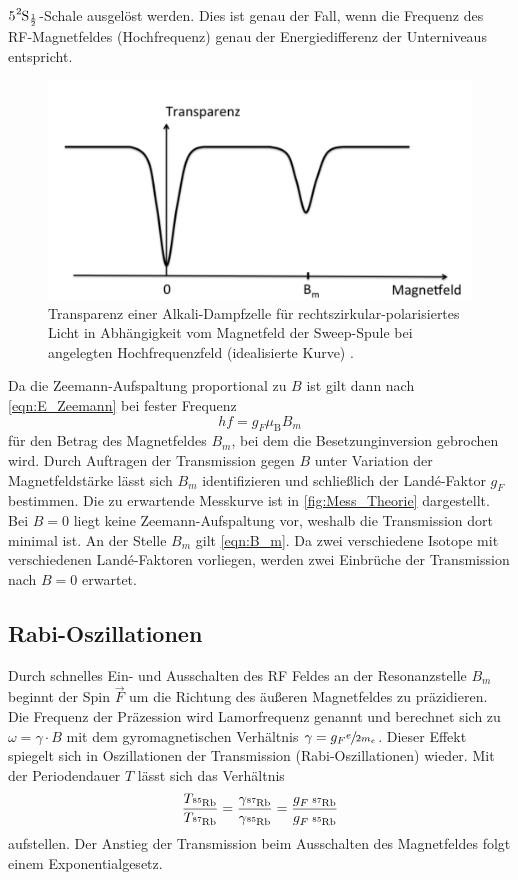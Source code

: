 $5\ce{^{2}\text{S}_{\frac{1}{2}}}$-Schale ausgelöst werden. Dies ist genau der Fall, wenn die Frequenz des RF-Magnetfeldes (Hochfrequenz) genau der 
Energiedifferenz der Unterniveaus entspricht. 
\begin{figure}
    \centering
    \includegraphics[width = .75\textwidth]{"content/pics/Messkurve_Theorie.png"}
    \caption{Transparenz einer Alkali-Dampfzelle für rechtszirkular-polarisiertes Licht in
    Abhängigkeit vom Magnetfeld der Sweep-Spule bei angelegten Hochfrequenzfeld
    (idealisierte Kurve) \cite{v21old}.}
    \label{fig:Mess_Theorie}
\end{figure}
Da die Zeemann-Aufspaltung proportional zu $B$ ist gilt dann nach \autoref{eqn:E_Zeemann} bei fester Frequenz
\begin{equation}
    \label{eqn:B_m}
    hf = g_F \mu_\text{B} B_m
\end{equation}
für den Betrag des Magnetfeldes $B_m$, bei dem die Besetzunginversion gebrochen wird.
Durch Auftragen der Transmission gegen $B$ unter Variation der Magnetfeldstärke lässt sich $B_m$ identifizieren und schließlich der Landé-Faktor $g_F$ bestimmen.
Die zu erwartende Messkurve ist in \autoref{fig:Mess_Theorie} dargestellt. Bei $B=0$ liegt keine Zeemann-Aufspaltung vor, weshalb die Transmission dort minimal ist.
An der Stelle $B_m$ gilt \autoref{eqn:B_m}. Da zwei verschiedene Isotope mit verschiedenen Landé-Faktoren vorliegen, werden zwei Einbrüche der Transmission nach 
$B = 0$ erwartet.

\subsection{Rabi-Oszillationen}
Durch schnelles Ein- und Ausschalten des RF Feldes an der Resonanzstelle $B_m$ beginnt der Spin $\vec{F}$ um die Richtung des äußeren Magnetfeldes zu 
präzidieren. Die Frequenz der Präzession wird Lamorfrequenz genannt und berechnet sich zu $\omega = \gamma \cdot B$ mit dem gyromagnetischen Verhältnis 
$\gamma = g_F \sfrac{e}{2m_e}$. Dieser Effekt spiegelt sich in Oszillationen der Transmission (Rabi-Oszillationen) wieder. Mit der Periodendauer $T$ lässt sich 
das Verhältnis
\begin{equation}
    \frac{T_{\ce{^{85}Rb}}}{T_{\ce{^{87}Rb}}} = \frac{\gamma_{\ce{^{87}Rb}}}{\gamma_{\ce{^{85}Rb}}} = \frac{g_{F \;{\ce{^{87}Rb}}}}{g_{F \;{\ce{^{85}Rb}}}}
\end{equation}
aufstellen.
Der Anstieg der Transmission beim Ausschalten des Magnetfeldes folgt einem Exponentialgesetz.
